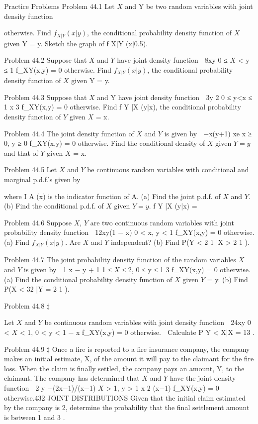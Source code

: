 Practice Problems
Problem 44.1
Let $X$ and Y be two random variables with joint density function

otherwise.
Find $f_{X|Y}(x|y)$, the conditional probability density function of $X$ given Y =
y. Sketch the graph of f X|Y (x|0.5).



Problem 44.2
Suppose that $X$ and $Y$ have joint density function

8xy 0 ≤ $X$ < y ≤ 1
f_{XY}(x,y) =
0
otherwise.
Find $f_{X|Y}(x|y)$, the conditional probability density function of $X$ given Y =
y.




Problem 44.3
Suppose that $X$ and Y have joint density function
 3y 2
0 ≤ y<x ≤ 1
x 3
f_{XY}(x,y) =
0
otherwise.
Find f Y |X (y|x), the conditional probability density function of $Y$ given $X$ =
x.




Problem 44.4
The joint density function of $X$ and $Y$ is given by
 −x(y+1)
xe
x ≥ 0, y ≥ 0
f_{XY}(x,y) =
0
otherwise.
Find the conditional density of $X$ given $Y = y$ and that of $Y$ given $X$ = x.



Problem 44.5
Let $X$ and $Y$ be continuous random variables with conditional and marginal
p.d.f.’s given by

where I A (x) is the indicator function of A.
(a) Find the joint p.d.f. of $X$ and $Y$.
(b) Find the conditional p.d.f. of $X$ given $Y = y$.
f Y |X (y|x) =


Problem 44.6
Suppose $X$, $Y$ are two continuous random variables with joint probability
density function

12xy(1 − x) 0 < x, y < 1
f_{XY}(x,y) =
0
otherwise.
(a) Find $f_{X|Y}(x|y)$. Are $X$ and $Y$ independent?
(b) Find P(Y < 2 1 |X > 2 1 ).



Problem 44.7
The joint probability density function of the random variables $X$ and $Y$ is
given by
 1
x − y + 1 1 ≤ $X$ ≤ 2, 0 ≤ y ≤ 1
3
f_{XY}(x,y) =
0
otherwise.
(a) Find the conditional probability density function of $X$ given $Y$ = y.
(b) Find P(X < 32 |Y = 2 1 ).



Problem 44.8 ‡

Let $X$ and $Y$ be continuous random variables with joint density function

24xy 0 < $X$ < 1, 0 < y < 1 − x
f_{XY}(x,y) =
0
otherwise.

Calculate P Y < X|X = 13 .



Problem 44.9 ‡
Once a fire is reported to a fire insurance company, the company makes an
initial estimate, X, of the amount it will pay to the claimant for the fire loss.
When the claim is finally settled, the company pays an amount, Y, to the
claimant. The company has determined that $X$ and $Y$ have the joint density
function

2
y −(2x−1)/(x−1) $X$ > 1, y > 1
x 2 (x−1)
f_{XY}(x,y) =
0
otherwise.432
JOINT DISTRIBUTIONS
Given that the initial claim estimated by the company is 2, determine the
probability that the final settlement amount is between 1 and 3 .



